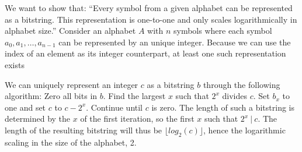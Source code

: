 \documentclass{article}
\begin{document}
We want to show that: \enquote{Every symbol from a given alphabet can be represented as a bitstring. This representation is one-to-one and only scales logarithmically in alphabet size.} Consider an alphabet $A$ with $n$ symbols where each symbol $a_0, a_1, \ldots, a_{n - 1}$ can be represented by an unique integer. Because we can use the index of an element as its integer counterpart, at least one such representation exists

We can uniquely represent an integer $c$ as a bitstring $b$ through the following algorithm: Zero all bits in $b$. Find the largest $x$ such that $2^x$ divides $c$. Set $b_x$ to one and set $c$ to $c - 2^x$. Continue until $c$ is zero. The length of such a bitstring is determined by the $x$ of the first iteration, so the first $x$ such that $2^x\ |\ c$. The length of the resulting bitstring will thus be $\lfloor log_2(c) \rfloor$, hence the logarithmic scaling in the size of the alphabet, 2.
\end{document}
